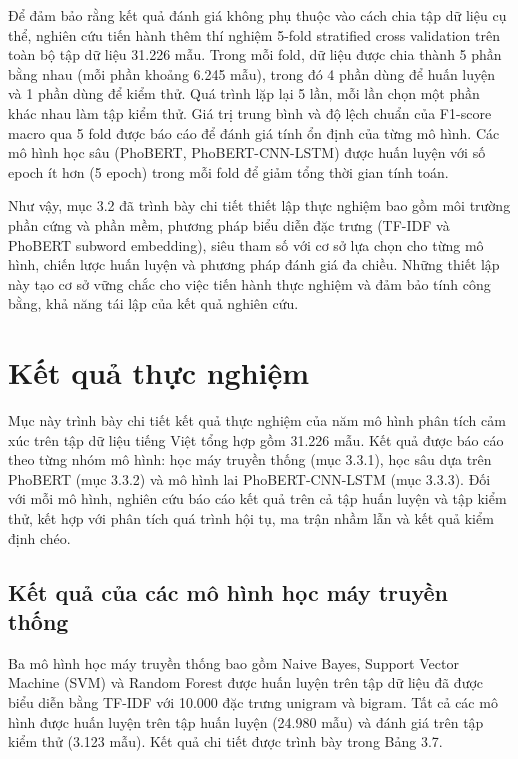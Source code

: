 \documentclass[14pt, a4paper]{report}
\begin{document}
Để đảm bảo rằng kết quả đánh giá không phụ thuộc vào cách chia tập dữ liệu cụ thể, nghiên cứu tiến hành thêm thí nghiệm 5-fold stratified cross validation trên toàn bộ tập dữ liệu 31.226 mẫu. Trong mỗi fold, dữ liệu được chia thành 5 phần bằng nhau (mỗi phần khoảng 6.245 mẫu), trong đó 4 phần dùng để huấn luyện và 1 phần dùng để kiểm thử. Quá trình lặp lại 5 lần, mỗi lần chọn một phần khác nhau làm tập kiểm thử. Giá trị trung bình và độ lệch chuẩn của F1-score macro qua 5 fold được báo cáo để đánh giá tính ổn định của từng mô hình. Các mô hình học sâu (PhoBERT, PhoBERT-CNN-LSTM) được huấn luyện với số epoch ít hơn (5 epoch) trong mỗi fold để giảm tổng thời gian tính toán.


Như vậy, mục 3.2 đã trình bày chi tiết thiết lập thực nghiệm bao gồm môi trường phần cứng và phần mềm, phương pháp biểu diễn đặc trưng (TF-IDF và PhoBERT subword embedding), siêu tham số với cơ sở lựa chọn cho từng mô hình, chiến lược huấn luyện và phương pháp đánh giá đa chiều. Những thiết lập này tạo cơ sở vững chắc cho việc tiến hành thực nghiệm và đảm bảo tính công bằng, khả năng tái lập của kết quả nghiên cứu.


\section{Kết quả thực nghiệm}


Mục này trình bày chi tiết kết quả thực nghiệm của năm mô hình phân tích cảm xúc trên tập dữ liệu tiếng Việt tổng hợp gồm 31.226 mẫu. Kết quả được báo cáo theo từng nhóm mô hình: học máy truyền thống (mục 3.3.1), học sâu dựa trên PhoBERT (mục 3.3.2) và mô hình lai PhoBERT-CNN-LSTM (mục 3.3.3). Đối với mỗi mô hình, nghiên cứu báo cáo kết quả trên cả tập huấn luyện và tập kiểm thử, kết hợp với phân tích quá trình hội tụ, ma trận nhầm lẫn và kết quả kiểm định chéo.


\subsection{Kết quả của các mô hình học máy truyền thống}


Ba mô hình học máy truyền thống bao gồm Naive Bayes, Support Vector Machine (SVM) và Random Forest được huấn luyện trên tập dữ liệu đã được biểu diễn bằng TF-IDF với 10.000 đặc trưng unigram và bigram. Tất cả các mô hình được huấn luyện trên tập huấn luyện (24.980 mẫu) và đánh giá trên tập kiểm thử (3.123 mẫu). Kết quả chi tiết được trình bày trong Bảng 3.7.
\end{document}
